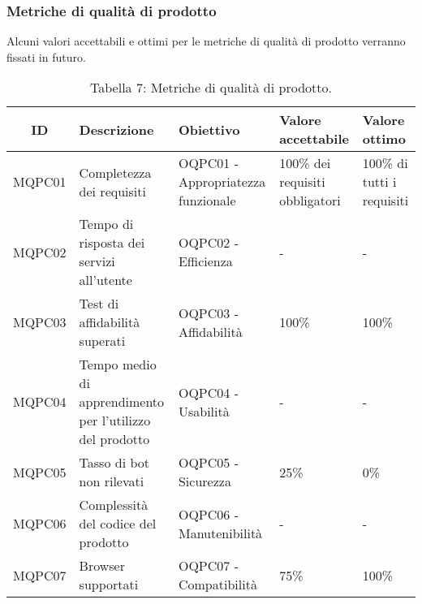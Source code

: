 \subsubsection{Metriche di qualità di prodotto}
Alcuni valori accettabili e ottimi per le metriche di qualità di prodotto verranno fissati in futuro.
\begin{table}[H]
	\centering
	\begin{tabularx}{\textwidth}{|c|X|X|X|X|}
		\hline
		\textbf{ID} & \textbf{Descrizione} & \textbf{Obiettivo} & \textbf{Valore accettabile} & \textbf{Valore ottimo}\\
		\hline
		MQPC01 & Completezza dei requisiti & OQPC01 - Appropriatezza funzionale & 100\% dei requisiti obbligatori & 100\% di tutti i requisiti\\
		\hline
		MQPC02 & Tempo di risposta dei servizi all'utente & OQPC02 - Efficienza & - & - \\
		\hline
		MQPC03 & Test di affidabilità superati & OQPC03 - Affidabilità & 100\% & 100\% \\
		\hline
		MQPC04 & Tempo medio di apprendimento per l'utilizzo del prodotto & OQPC04 - Usabilità & - &  - \\
		\hline
		MQPC05 & Tasso di bot non rilevati  & OQPC05 - Sicurezza & 25\% &  0\% \\
		\hline
		MQPC06 & Complessità del codice del prodotto & OQPC06 - Manutenibilità & - & - \\
		\hline
		MQPC07 & Browser supportati & OQPC07 - Compatibilità & 75\% & 100\% \\
		\hline
	\end{tabularx}
	\caption{Tabella 7: Metriche di qualità di prodotto.}
\end{table}